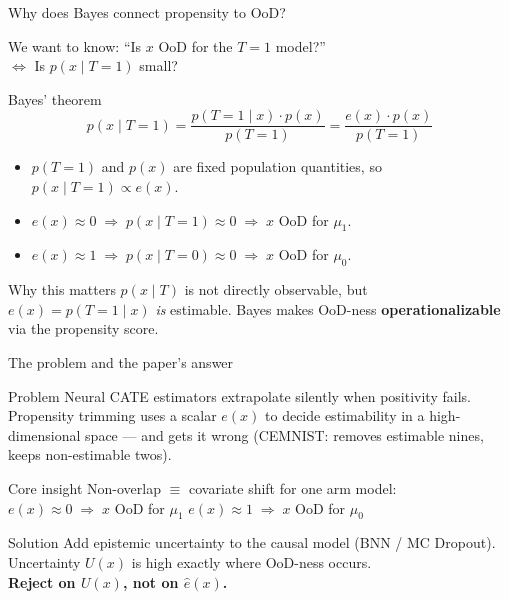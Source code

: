 \documentclass[aspectratio=169]{beamer}
\begin{document}
\begin{frame}{Why does Bayes connect propensity to OoD?}

We want to know: ``Is $x$ OoD for the $T=1$ model?''\\
$\Leftrightarrow$ Is $p(x \mid T=1)$ small?

\bigskip
\begin{block}{Bayes' theorem}
\[
p(x \mid T=1)
= \frac{p(T=1 \mid x)\cdot p(x)}{p(T=1)}
= \frac{e(x)\cdot p(x)}{p(T=1)}
\]
\end{block}

\medskip
\begin{itemize}
  \item $p(T=1)$ and $p(x)$ are fixed population quantities, so
        $p(x \mid T=1) \propto e(x)$.
  \item $e(x)\approx 0 \;\Rightarrow\; p(x\mid T=1)\approx 0 \;\Rightarrow\; x$ OoD for $\mu_1$.
  \item $e(x)\approx 1 \;\Rightarrow\; p(x\mid T=0)\approx 0 \;\Rightarrow\; x$ OoD for $\mu_0$.
\end{itemize}

\smallskip
\begin{block}{Why this matters}
$p(x\mid T)$ is not directly observable, but $e(x)=p(T=1\mid x)$ \emph{is} estimable.
Bayes makes OoD-ness \textbf{operationalizable} via the propensity score.
\end{block}
\end{frame}

\begin{frame}{The problem and the paper's answer}

\begin{block}{Problem}
Neural CATE estimators extrapolate silently when positivity fails.
Propensity trimming uses a scalar $e(x)$ to decide estimability in a
high-dimensional space --- and gets it wrong (CEMNIST: removes estimable
nines, keeps non-estimable twos).
\end{block}

\smallskip
\begin{block}{Core insight}
Non-overlap $\equiv$ covariate shift for one arm model:\\[2pt]
$e(x)\approx 0 \;\Rightarrow\; x$ OoD for $\mu_1$
\quad
$e(x)\approx 1 \;\Rightarrow\; x$ OoD for $\mu_0$
\end{block}

\smallskip
\begin{block}{Solution}
Add epistemic uncertainty to the causal model (BNN / MC Dropout).\\
Uncertainty $U(x)$ is high exactly where OoD-ness occurs.\\
\textbf{Reject on $U(x)$, not on $\hat e(x)$.}
\end{block}

\end{frame}
\end{document}
